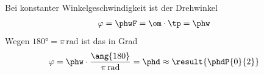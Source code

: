 Bei konstanter Winkelgeschwindigkeit ist der Drehwinkel
\begin{align}
 \varphi &= \phwF = \om\cdot\tp = \phw
\end{align}
Wegen $\ang{180} = \pi\,\mathrm{rad}$ ist das in Grad
\begin{align}
 \varphi &= \phw\cdot\frac{\ang{180}}{\pi\,\mathrm{rad}} = \phd \approx \result{\phdP{0}{2}}
\end{align}
